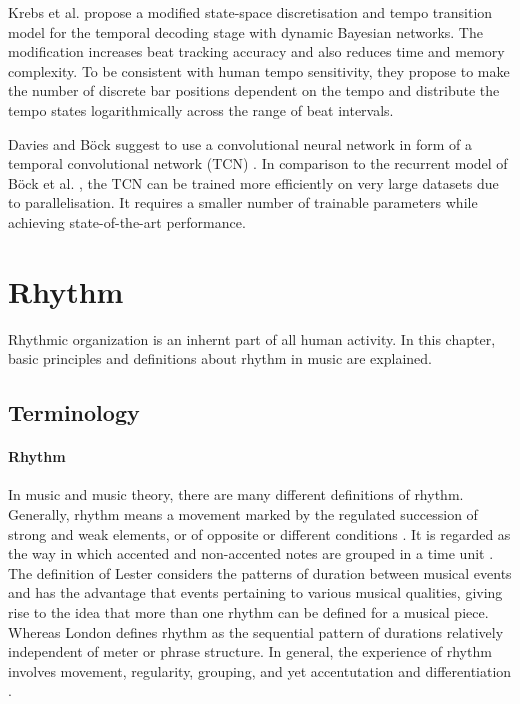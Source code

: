 \documentclass{scrartcl}
\begin{document}
Krebs et al. \cite{Krebs2015} propose a modified state-space discretisation and tempo transition model for the temporal decoding stage with dynamic Bayesian networks. The modification increases beat tracking accuracy and also reduces time and memory complexity. To be consistent with human tempo sensitivity, they propose to make the number of discrete bar positions dependent on the tempo and distribute the tempo states logarithmically across the range of beat intervals. 

Davies and Böck \cite{Davies2019} suggest to use a convolutional neural network in form of a temporal convolutional network (TCN) \cite{Bai2018}. In comparison to the recurrent model of Böck et al. \cite{Boeck2014}, the TCN can be trained more efficiently on very large datasets due to parallelisation. It requires a smaller number of trainable parameters while achieving state-of-the-art performance. 



\newpage
\section{Rhythm}
\label{sec:perception}

Rhythmic organization is an inhernt part of all human activity. In this chapter, basic principles and definitions about rhythm in music are explained.  


\subsection{Terminology}

\paragraph{Rhythm} 
In music and music theory, there are many different definitions of rhythm. Generally, rhythm means a movement marked by the regulated succession of strong and weak elements, or of opposite or different conditions \cite{Dictionary1971}. It is regarded as the way in which accented and non-accented notes are grouped in a time unit \cite{Cooper1966}. The definition of Lester \cite{Lester1986} considers the patterns of duration between musical events and has the advantage that events pertaining to various musical qualities, giving rise to the idea that more than one rhythm can be defined for a musical piece. Whereas London \cite{London2001} defines rhythm as the sequential pattern of durations relatively independent of meter or phrase structure. In general, the experience of rhythm involves movement, regularity, grouping, and yet accentutation and differentiation \cite{Handel1989}.
\end{document}
